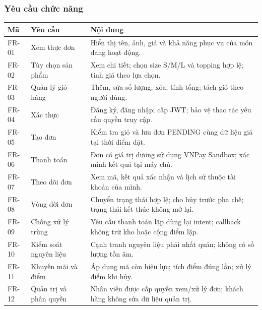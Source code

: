 \documentclass[12pt,a4paper]{article}
\begin{document}
\subsubsection{Yêu cầu chức năng}
\begin{longtable}{P{1.2cm}P{3.4cm}P{10.0cm}}
\toprule\textbf{Mã}&\textbf{Yêu cầu}&\textbf{Nội dung}\\\midrule\endhead
FR-01&Xem thực đơn&Hiển thị tên, ảnh, giá và khả năng phục vụ của món đang hoạt động.\\
FR-02&Tùy chọn sản phẩm&Xem chi tiết; chọn size S/M/L và topping hợp lệ; tính giá theo lựa chọn.\\
FR-03&Quản lý giỏ hàng&Thêm, sửa số lượng, xóa; tính tổng; tách giỏ theo người dùng.\\
FR-04&Xác thực&Đăng ký, đăng nhập; cấp JWT; bảo vệ thao tác yêu cầu quyền truy cập.\\
FR-05&Tạo đơn&Kiểm tra giỏ và lưu đơn PENDING cùng dữ liệu giá tại thời điểm đặt.\\
FR-06&Thanh toán&Đơn có giá trị dương sử dụng VNPay Sandbox; xác minh kết quả tại máy chủ.\\
FR-07&Theo dõi đơn&Xem mã, kết quả xác nhận và lịch sử thuộc tài khoản của mình.\\
FR-08&Vòng đời đơn&Chuyển trạng thái hợp lệ; cho hủy trước pha chế; trạng thái kết thúc không mở lại.\\
FR-09&Chống xử lý trùng&Yêu cầu thanh toán lặp dùng lại intent; callback không trừ kho hoặc cộng điểm lặp.\\
FR-10&Kiểm soát nguyên liệu&Cạnh tranh nguyên liệu phải nhất quán; không có số lượng tồn âm.\\
FR-11&Khuyến mãi và điểm&Áp dụng mã còn hiệu lực; tích điểm đúng lần; xử lý điểm khi hủy.\\
FR-12&Quản trị và phân quyền&Nhân viên được cấp quyền xem/xử lý đơn; khách hàng không sửa dữ liệu quản trị.\\
\bottomrule
\end{longtable}
\end{document}
